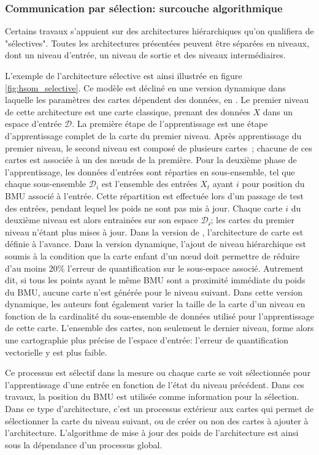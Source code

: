 \documentclass[../main]{subfiles}
\begin{document}
\subsubsection{Communication par sélection: surcouche algorithmique}

Certains travaux s'appuient sur des architectures hiérarchiques qu'on qualifiera de "sélectives". 
Toutes les architectures présentées peuvent être séparées en niveaux, dont un niveau d'entrée, un niveau de sortie et des niveaux intermédiaires. 

L'exemple de l'architecture sélective \cite{barbalho_hierarchical_2001} est ainsi illustrée en figure \ref{fig:hsom_selective}. Ce modèle est décliné en une version dynamique dans laquelle les paramètres des cartes dépendent des données, en \cite{Costa2016ANS}.
Le premier niveau de cette architecture est une carte classique, prenant des données $X$ dans un espace d'entrée $\mathcal{D}$.
La première étape de l'apprentissage est une étape d'apprentissage complet de la carte du premier niveau.
Après apprentissage du premier niveau, le second niveau est composé de plusieurs cartes~; chacune de ces cartes est associée à un des n\oe{}uds de la première.
Pour la deuxième phase de l'apprentissage, les données d'entrées sont réparties en sous-ensemble, tel que chaque sous-ensemble $\mathcal{D}_i$ est l'ensemble des entrées $X_t$ ayant $i$ pour position du BMU associé à l'entrée. Cette répartition est effectuée lors d'un passage de test des entrées, pendant lequel les poids ne sont pas mis à jour.
Chaque carte $i$ du deuxième niveau est alors entrainées sur son espace $\mathcal{D_i}$; les cartes du premier niveau n'étant plus mises à jour.
Dans la version de \cite{barbalho_hierarchical_2001}, l'architecture de carte est définie à l'avance. Dans la version dynamique, l'ajout de niveau hiérarchique est soumis à la condition que la carte enfant d'un n\oe{}ud doit permettre de réduire d'au moins 20\% l'erreur de quantification sur le sous-espace associé. Autrement dit, si tous les points ayant le même BMU sont a proximité immédiate du poids du BMU, aucune carte n'est générée pour le niveau suivant. Dans cette version dynamique, les auteurs font également varier la taille de la carte d'un niveau en fonction de la cardinalité du sous-ensemble de données utilisé pour l'apprentissage de cette carte.
L'ensemble des cartes, non seulement le dernier niveau, forme alors une cartographie plus précise de l'espace d'entrée: l'erreur de quantification vectorielle y est plus faible.

Ce processus est sélectif dans la mesure ou chaque carte se voit sélectionnée pour l'apprentissage d'une entrée en fonction de l'état du niveau précédent. Dans ces travaux, la position du BMU est utilisée comme information pour la sélection. 
Dans ce type d'architecture, c'est un processus extérieur aux cartes qui permet de sélectionner la carte du niveau suivant, ou de créer ou non des cartes à ajouter à l'architecture. L'algorithme de mise à jour des poids de l'architecture est ainsi sous la dépendance d'un processus global.
\end{document}
